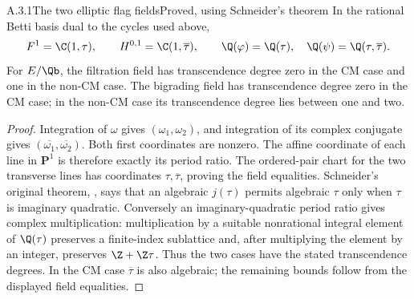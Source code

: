 \begin{result}{A.3.1}{The two elliptic flag fields}{Proved, using Schneider's theorem}
In the rational Betti basis dual to the cycles used above,
\[
 F^1=\C(1,\tau),\qquad H^{0,1}=\C(1,\overline\tau),
 \qquad \Q(\varphi)=\Q(\tau),\quad
 \Q(\psi)=\Q(\tau,\overline\tau).
\]
For $E/\Qb$, the filtration field has transcendence degree zero in the CM case and one in the non-CM case. The bigrading field has transcendence degree zero in the CM case; in the non-CM case its transcendence degree lies between one and two.
\end{result}
\begin{proof}
Integration of $\omega$ gives $(\omega_1,\omega_2)$, and integration of its complex conjugate gives $(\overline{\omega_1},\overline{\omega_2})$. Both first coordinates are nonzero. The affine coordinate of each line in $\mathbf P^1$ is therefore exactly its period ratio. The ordered-pair chart for the two transverse lines has coordinates $\tau,\overline\tau$, proving the field equalities. Schneider's original theorem, \cite[\S1, result IIc, p.5]{EllSchneider1937}, says that an algebraic $j(\tau)$ permits algebraic $\tau$ only when $\tau$ is imaginary quadratic. Conversely an imaginary-quadratic period ratio gives complex multiplication: multiplication by a suitable nonrational integral element of $\Q(\tau)$ preserves a finite-index sublattice and, after multiplying the element by an integer, preserves $\Z+\Z\tau$. Thus the two cases have the stated transcendence degrees. In the CM case $\overline\tau$ is also algebraic; the remaining bounds follow from the displayed field equalities.
\end{proof}

